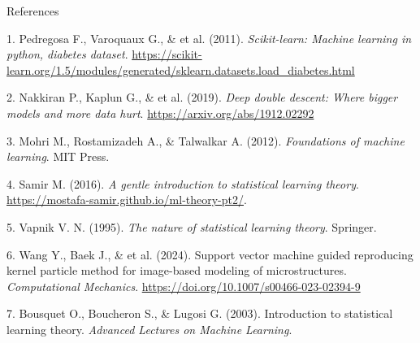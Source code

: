 \documentclass[
  ignorenonframetext,
]{beamer}
\newlength{\cslhangindent}
\newenvironment{CSLReferences}[2] %
 {\begin{list}{}{%
  \setlength{\itemindent}{0pt}
  \setlength{\leftmargin}{0pt}
  \setlength{\parsep}{0pt}
  \ifodd #1
   \setlength{\leftmargin}{\cslhangindent}
   \setlength{\itemindent}{-1\cslhangindent}
  \fi
  \setlength{\itemsep}{#2\baselineskip}}}
 {\end{list}}
\begin{document}
\begin{frame}
\begin{block}{References}
\label{references}
\label{refs}
\begin{CSLReferences}{1}{0}
\footnotesize

1. Pedregosa F., Varoquaux G., \& et al. (2011). \emph{Scikit-learn:
Machine learning in python, diabetes dataset}.
\url{https://scikit-learn.org/1.5/modules/generated/sklearn.datasets.load_diabetes.html}

2. Nakkiran P., Kaplun G., \& et al. (2019). \emph{Deep double descent:
Where bigger models and more data hurt}.
\url{https://arxiv.org/abs/1912.02292}

3. Mohri M., Rostamizadeh A., \& Talwalkar A. (2012). \emph{Foundations
of machine learning}. MIT Press.

4. Samir M. (2016). \emph{A gentle introduction to statistical learning
theory}. \url{https://mostafa-samir.github.io/ml-theory-pt2/}.

5. Vapnik V. N. (1995). \emph{The nature of statistical learning
theory}. Springer.

6. Wang Y., Baek J., \& et al. (2024). Support vector machine guided
reproducing kernel particle method for image-based modeling of
microstructures. \emph{Computational Mechanics}.
\url{https://doi.org/10.1007/s00466-023-02394-9}

7. Bousquet O., Boucheron S., \& Lugosi G. (2003). Introduction to
statistical learning theory. \emph{Advanced Lectures on Machine
Learning}.

\end{CSLReferences}
\end{block}
\end{frame}
\end{document}
